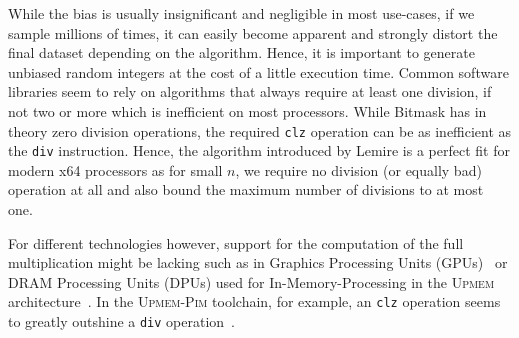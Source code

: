 \documentclass[a4paper, UKenglish, cleveref, autoref, thm-restate]{lipics-v2021}
\begin{document}
While the bias is usually insignificant and negligible in most use-cases, if we sample millions of times, it can easily become apparent and strongly distort the final dataset depending on the algorithm.
Hence, it is important to generate unbiased random integers at the cost of a little execution time.
Common software libraries seem to rely on algorithms that always require at least one division, if not two or more which is inefficient on most processors.
While Bitmask has in theory zero division operations, the required \texttt{clz} operation can be as inefficient as the \texttt{div} instruction.
Hence, the algorithm introduced by Lemire is a perfect fit for modern x64 processors as for small $n$, we require no division (or equally bad) operation at all and also bound the maximum number of divisions to at most one.

For different technologies however, support for the computation of the full multiplication might be lacking such as in Graphics Processing Units (GPUs)~\cite{GPU} or DRAM Processing Units (DPUs) used for In-Memory-Processing in the \textsc{Upmem} architecture~\cite{Upmem, UpmemSDK}.
In the \textsc{Upmem-Pim} toolchain, for example, an \texttt{clz} operation seems to greatly outshine a \texttt{div} operation~\cite{UpmemRng}.






\end{document}
